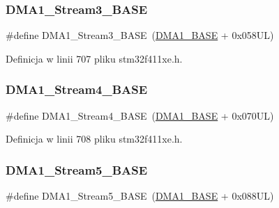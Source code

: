 \subsubsection{\texorpdfstring{D\+M\+A1\+\_\+\+Stream3\+\_\+\+B\+A\+SE}{DMA1\_Stream3\_BASE}}
{\footnotesize\ttfamily \#define D\+M\+A1\+\_\+\+Stream3\+\_\+\+B\+A\+SE~(\hyperlink{group___peripheral__memory__map_gab2d8a917a0e4ea99a22ac6ebf279bc72}{D\+M\+A1\+\_\+\+B\+A\+SE} + 0x058\+U\+L)}



Definicja w linii 707 pliku stm32f411xe.\+h.

\mbox{\label{group___peripheral__memory__map_ga757a3c0d866c0fe68c6176156065a26b}} 
\subsubsection{\texorpdfstring{D\+M\+A1\+\_\+\+Stream4\+\_\+\+B\+A\+SE}{DMA1\_Stream4\_BASE}}
{\footnotesize\ttfamily \#define D\+M\+A1\+\_\+\+Stream4\+\_\+\+B\+A\+SE~(\hyperlink{group___peripheral__memory__map_gab2d8a917a0e4ea99a22ac6ebf279bc72}{D\+M\+A1\+\_\+\+B\+A\+SE} + 0x070\+U\+L)}



Definicja w linii 708 pliku stm32f411xe.\+h.

\mbox{\label{group___peripheral__memory__map_ga0ded7bed8969fe2e2d616e7f90eb7654}} 
\subsubsection{\texorpdfstring{D\+M\+A1\+\_\+\+Stream5\+\_\+\+B\+A\+SE}{DMA1\_Stream5\_BASE}}
{\footnotesize\ttfamily \#define D\+M\+A1\+\_\+\+Stream5\+\_\+\+B\+A\+SE~(\hyperlink{group___peripheral__memory__map_gab2d8a917a0e4ea99a22ac6ebf279bc72}{D\+M\+A1\+\_\+\+B\+A\+SE} + 0x088\+U\+L)}



